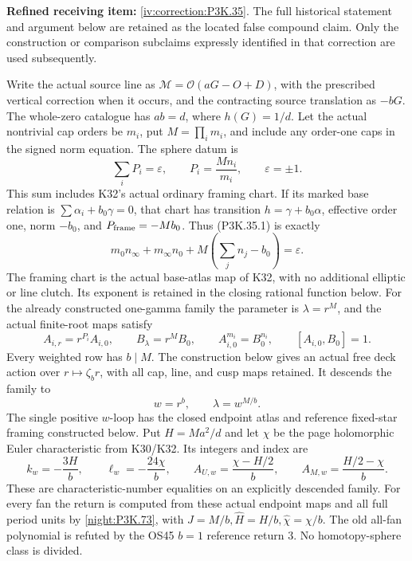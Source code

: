 \begin{theorem}\hypertarget{tag-02UG}{}\label{night:P3K.35}

\par\noindent\textbf{Refined receiving item:} \cref{iv:correction:P3K.35}. The full historical statement and argument below are retained as the located false compound claim. Only the construction or comparison subclaims expressly identified in that correction are used subsequently.

Write the actual source line as
\(\mathcal M=\mathcal O(aG-O+D)\), with the prescribed vertical
correction when it occurs, and the contracting source translation as
\(-bG\). The whole-zero catalogue has \(ab=d\), where \(h(G)=1/d\).
Let the actual nontrivial cap orders be \(m_i\), put
\(M=\prod_i m_i\), and include any order-one caps in the signed
norm equation. The sphere datum is
\[
           \sum_i P_i=\varepsilon,\qquad
           P_i=\frac{M n_i}{m_i},\qquad \varepsilon=\pm1.
                                                               \tag{P3K.35.1}
\]
This sum includes K32's actual ordinary framing chart. If its marked
base relation is \(\sum\alpha_i+b_0\gamma=0\), that chart has
transition \(h=\gamma+b_0\alpha\), effective order one, norm
\(-b_0\), and \(P_{\rm frame}=-Mb_0\). Thus (P3K.35.1) is exactly
\[
 m_0n_\infty+m_\infty n_0
                +M\left(\sum_jn_j-b_0\right)=\varepsilon.
\]
The framing chart is the actual base-atlas map of K32, with no
additional elliptic or line clutch. Its exponent is retained in
the closing rational function below.
For the already constructed one-gamma family the parameter is
\(\lambda=r^M\), and the actual finite-root maps satisfy
\[
 A_{i,r}=r^{P_i}A_{i,0},\qquad B_\lambda=r^M B_0,
 \qquad A_{i,0}^{m_i}=B_0^{n_i},\qquad[A_{i,0},B_0]=1.
                                                               \tag{P3K.35.2}
\]
Every weighted row has \(b\mid M\). The construction below gives
an actual free deck action over \(r\mapsto\zeta_b r\), with all
cap, line, and cusp maps retained. It descends the family to
\[
                     w=r^b,\qquad \lambda=w^{M/b}.       \tag{P3K.35.3}
\]
The single positive \(w\)-loop has the closed endpoint atlas and reference fixed-star framing constructed below.
Put \(H=Ma^2/d\) and let \(\chi\) be the page holomorphic Euler
characteristic from K30/K32. Its integers and index are
\[
 k_w=-\frac{3H}{b},\qquad
 \ell_w=-\frac{24\chi}{b},\qquad
 A_{U,w}=\frac{\chi-H/2}{b},\qquad A_{M,w}=\frac{H/2-\chi}{b}.                              \tag{P3K.35.4}
\]
These are characteristic-number equalities on an explicitly descended
family. For every fan the return is computed from these actual endpoint
maps and all full period units by \cref{night:P3K.73}, with
\(J=M/b,\widehat H=H/b,\widehat\chi=\chi/b\).
The old all-fan polynomial is refuted by the OS45 \(b=1\)
reference return \(3\). No homotopy-sphere class is divided.

\end{theorem}

